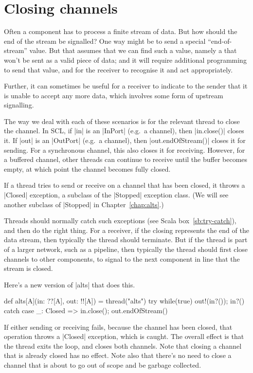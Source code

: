 \section{Closing channels}

Often a component has to process a finite stream of data.  But how should the
end of the stream be signalled?  One way might be to send a special
``end-of-stream'' value.  But that assumes that we can find such a value,
namely a that won't be sent as a valid piece of data; and it will require
additional programming to send that value, and for the receiver to recognise
it and act appropriately.

Further, it can sometimes be useful for a receiver to indicate to the sender
that it is unable to accept any more data, which involves some form of
upstream signalling.

The way we deal with each of these scenarios is for the relevant thread to
close the channel. 
%
In SCL, if |in| is an |InPort| (e.g.~a channel), then |in.close()| closes it.
%
If |out| is an |OutPort| (e.g.~a channel), then |out.endOfStream()| closes it
for sending.  For a synchronous channel, this also closes it for receiving.
However, for a buffered channel, other threads can continue to receive until
the buffer becomes empty, at which point the channel becomes fully closed.


If a thread tries to send or receive on a channel that has been closed, it
throws a |Closed| exception, a subclass of the |Stopped| exception class.
(We will see another subclass of |Stopped| in Chapter~\ref{chap:alts}.)

Threads should normally catch such exceptions (see Scala
box~\ref{sb:try-catch}), and then do the right thing.  For a receiver, if the
closing represents the end of the data stream, then typically the thread
should terminate.  But if the thread is part of a larger network, such as a
pipeline, then typically the thread should first close channels to other
components, to signal to the next component in line that the stream is closed.


\pagebreak[3]

Here's a new version of |alts| that does this.
%
\begin{mysamepage}
\begin{scala}
  def alts[A](in: ??[A], out: !![A]) = thread("alts"){ 
    try{ while(true){ out!(in?()); in?() } } 
    catch{ case _: Closed => in.close(); out.endOfStream() }
  }
\end{scala}
\end{mysamepage}
% 
If either sending or receiving fails, because the channel has been closed,
that operation throws a |Closed| exception, which is caught.  The overall
effect is that the thread exits the loop, and closes both channels.  
%
Note that closing a channel that is already closed has no effect.
Note also that there's no need to close a channel that is about to go out of
scope and be garbage collected. 

